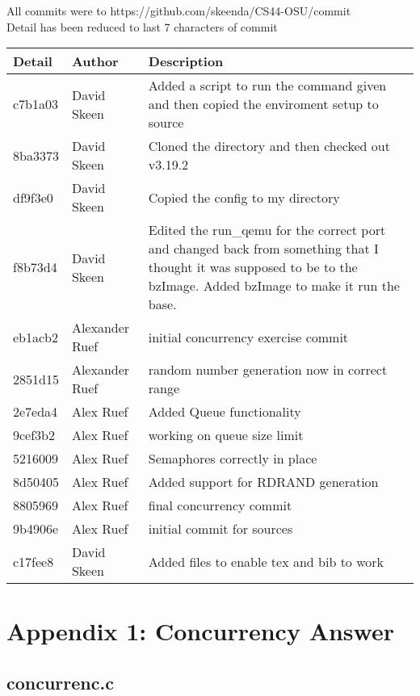 \documentclass[10pt,drafclsnofoot,onecolumn]{article}
\begin{document}
All commits were to https://github.com/skeenda/CS44-OSU/commit\\
Detail has been reduced to last 7 characters of commit\\
\begin{tabular}{|p{5cm}|p{5cm}|p{5cm}}\textbf{Detail} & \textbf{Author} & \textbf{Description}\\
\hline
c7b1a03 & David Skeen & Added a script to run the command given and then copied the enviroment setup to source\\\hline
8ba3373 & David Skeen &  Cloned the directory and then checked out v3.19.2\\\hline
df9f3e0 & David Skeen & Copied the config to my directory\\\hline
f8b73d4 & David Skeen &  Edited the run\_qemu for the correct port and changed back from something that I thought it was supposed to be to the bzImage. Added bzImage to make it run the base.\\\hline
eb1acb2 & Alexander Ruef & initial concurrency exercise commit\\\hline
2851d15 & Alexander Ruef & random number generation now in correct range\\\hline
2e7eda4 & Alex Ruef & Added Queue functionality\\\hline
9cef3b2 & Alex Ruef & working on queue size limit\\\hline
5216009 & Alex Ruef & Semaphores correctly in place\\\hline
8d50405 & Alex Ruef & Added support for RDRAND generation\\\hline
8805969 & Alex Ruef & final concurrency commit\\\hline
9b4906e & Alex Ruef & initial commit for sources\\\hline
c17fee8 & David Skeen & Added files to enable tex and bib to work\\\hline
\end{tabular}

\section{Appendix 1: Concurrency Answer}
\subsection{concurrenc.c}
\begin{lstlisting}

 \end{lstlisting}



\end{document}
